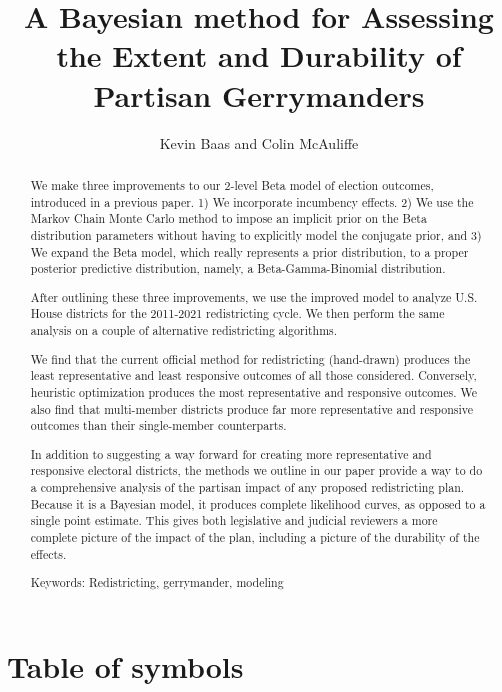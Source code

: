 \documentclass[preprint,12pt]{article}
\begin{document}
\title{A Bayesian method for Assessing the Extent and Durability of Partisan Gerrymanders}

\author{Kevin Baas and Colin McAuliffe}

\maketitle

\begin{abstract}
We make three improvements to our 2-level Beta model of election outcomes, introduced in a previous paper.  1) We incorporate incumbency effects. 2) We use the Markov Chain Monte Carlo method to impose an implicit prior on the Beta distribution parameters without having to explicitly model the conjugate prior, and 3) We expand the Beta model, which really represents a prior distribution, to a proper posterior predictive distribution, namely, a Beta-Gamma-Binomial distribution.  

After outlining these three improvements, we use the improved model to analyze U.S. House districts for the 2011-2021 redistricting cycle.  We then perform the same analysis on a couple of alternative redistricting algorithms.

We find that the current official method for redistricting (hand-drawn) produces the least representative and least responsive outcomes of all those considered.  Conversely, heuristic optimization produces the most representative and responsive outcomes.  We also find that multi-member districts produce far more representative and responsive outcomes than their single-member counterparts.

In addition to suggesting a way forward for creating more representative and responsive electoral districts, the methods we outline in our paper provide a way to do a comprehensive analysis of the partisan impact of any proposed redistricting plan.  Because it is a Bayesian model, it produces complete likelihood curves, as opposed to a single point estimate.  This gives both legislative and judicial reviewers a more complete picture of the impact of the plan, including a picture of the durability of the effects.

Keywords: Redistricting, gerrymander, modeling

\end{abstract}

\clearpage

\section{Table of symbols}
\end{document}
